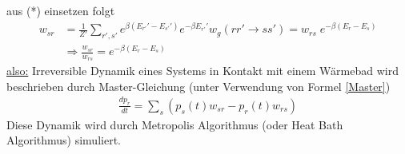 \documentclass[12pt]{article}
\begin{document}
aus (*) einsetzen folgt
\begin{align}
w_{sr}&= \frac{1}{Z'} \sum_{r',s'} e^{\beta (E_{r'}' -E_{s'}') } e^{-\beta E_{r'}'}  w_g (rr' \rightarrow ss') = w_{rs} \; e^{-\beta (E_r - E_s)} \\
& \Rightarrow  \frac{w_{sr}}{w_{rs}}= e^{-\beta (E_r - E_s)} \label{Master}
\end{align}
\underline{also:} Irreversible Dynamik eines Systems in Kontakt mit einem Wärmebad wird beschrieben durch Master-Gleichung (unter Verwendung von Formel \ref{Master})
\begin{align}
 \frac{dp_r}{dt}= \sum_s( p_s(t) w_{sr} - p_r(t) w_{rs})
\end{align}
 Diese Dynamik wird durch Metropolis Algorithmus (oder Heat Bath Algorithmus) simuliert. %
\end{document}
